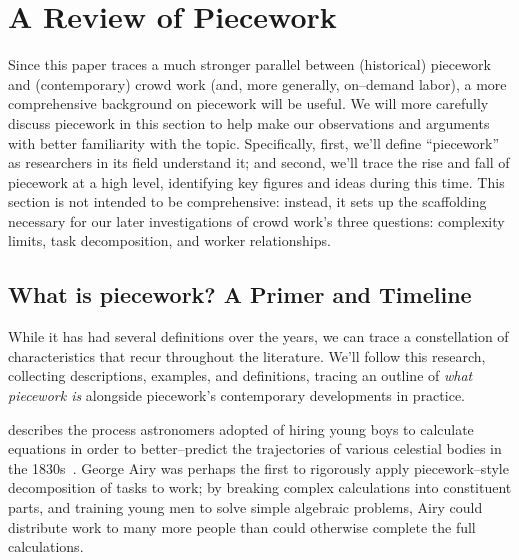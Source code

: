 \documentclass[trackingWork]{subfiles}
\begin{document}
\section{A Review of Piecework}

Since this paper traces a much stronger parallel between
(historical) piecework and (contemporary) crowd work
(and, more generally, on--demand labor),
a more comprehensive background on piecework will be useful.
We will more carefully discuss piecework in this section
to help make our observations and arguments with better familiarity with the topic.
Specifically,
first, we'll define ``piecework'' as researchers in its field understand it;
and second, we'll trace the rise and fall of piecework at a high level,
identifying key figures and ideas during this time.
This section is not intended to be comprehensive:
instead, it sets up the scaffolding necessary for
our later investigations of crowd work's three questions:
complexity limits,
task decomposition, and
worker relationships.




\subsection{What is piecework? A Primer and Timeline}\label{sec:whatIsPiecework}

While it has had several definitions over the years,
we can trace a constellation of characteristics that recur throughout the literature.
We'll follow this research, collecting
descriptions,
examples, and
definitions,
tracing an outline of %
\textit{what piecework is}
alongside piecework's contemporary developments in practice.

\citeauthor{grier2013computers} describes the process astronomers adopted of hiring young boys
to calculate equations in order
to better--predict the trajectories of various celestial bodies in the 1830s~\cite{grier2013computers}.
George Airy was perhaps the first to rigorously apply piecework--style decomposition of tasks to work;
by breaking complex calculations into constituent parts, and
training young men to solve simple algebraic problems,
Airy could distribute work to many more people than could otherwise complete the full calculations.
\end{document}
